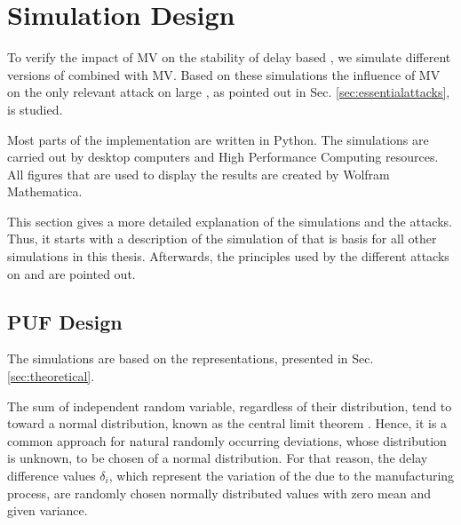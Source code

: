 \chapter{Simulation Design}
\label{cap:simulationdesign}

To verify the impact of \ac{MV} on the stability of delay based \pufs, we simulate different versions of \apufs combined with \ac{MV}.
Based on these simulations the influence of \ac{MV} on the only relevant attack on large \xpufs, as pointed out in Sec. \ref{sec:essentialattacks}, is studied.

Most parts of the implementation are written in Python. 
The simulations are carried out by desktop computers and High Performance Computing resources. 
All figures that are used to display the results are created by Wolfram Mathematica.

This section gives a more detailed explanation of the simulations and the attacks.
Thus, it starts with a description of the simulation of \apufs that is basis for all other \puf simulations in this thesis.
Afterwards, the principles used by the different attacks on \mpufs and \mxpufs are pointed out.



\section{\ac{PUF} Design}
\label{sec:pufsimulation}

The \apuf simulations are based on the \apuf representations, presented in Sec. \ref{sec:theoretical}.

The sum of independent random variable, regardless of their distribution, tend to toward a normal distribution, known as the central limit theorem \cite{Wikipedia2017CentralTheorem}.
Hence, it is a common approach for natural randomly occurring deviations, whose distribution is unknown, to be chosen of a normal distribution.
For that reason, the delay difference values $\delta_i$, which represent the variation of the \apuf due to the manufacturing process, are randomly chosen normally distributed values with zero mean and given variance. %

